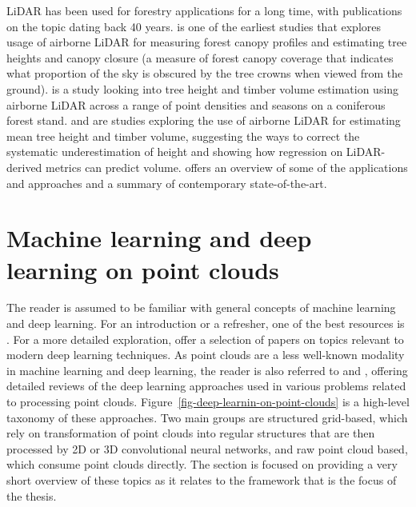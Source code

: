 LiDAR has been used for forestry applications for a long time, with publications on the topic dating back 40 years.
\citet{nelsonDeterminingForestCanopy1984} is one of the earliest studies that explores usage of airborne LiDAR for measuring forest canopy profiles and estimating tree heights and canopy closure (a measure of forest canopy coverage that indicates what proportion of the sky is obscured by the tree crowns when viewed from the ground).
\citet{nilssonEstimationTreeHeights1996} is a study looking into tree height and timber volume estimation using airborne LiDAR across a range of point densities and seasons on a coniferous forest stand.
\citet{naessetDeterminationMeanTree1997} and \citet{naessetEstimatingTimberVolume1997} are studies exploring the use of airborne LiDAR for estimating mean tree height and timber volume, suggesting the ways to correct the systematic underestimation of height and showing how regression on LiDAR-derived metrics can predict volume.
\citet{carson2004lidar} offers an overview of some of the applications and approaches and a summary of contemporary state-of-the-art.

\section{Machine learning and deep learning on point clouds}\label{sec-ml-dl}

The reader is assumed to be familiar with general concepts of machine learning and deep learning.
For an introduction or a refresher, one of the best resources is \citet{goodfellowDeepLearning2016}.
For a more detailed exploration, \citet{wangRecentAdvancesDeep2020} offer a selection of papers on topics relevant to modern deep learning techniques.
As point clouds are a less well-known modality in machine learning and deep learning, the reader is also referred to \citet{belloReviewDeepLearning2020} and \citet{guoDeepLearning3D2021}, offering detailed reviews of the deep learning approaches used in various problems related to processing point clouds.
Figure~\ref{fig-deep-learnin-on-point-clouds} is a high-level taxonomy of these approaches.
Two main groups are structured grid-based, which rely on transformation of point clouds into regular structures that are then processed by 2D or 3D convolutional neural networks, and raw point cloud based, which consume point clouds directly.
The section is focused on providing a very short overview of these topics as it relates to the framework that is the focus of the thesis.

